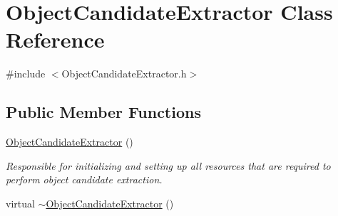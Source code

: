 \hypertarget{class_object_candidate_extractor}{\section{\-Object\-Candidate\-Extractor \-Class \-Reference}
\label{class_object_candidate_extractor}
}


{\ttfamily \#include $<$\-Object\-Candidate\-Extractor.\-h$>$}

\subsection*{\-Public \-Member \-Functions}
\begin{DoxyCompactItemize}
\item 
\hypertarget{class_object_candidate_extractor_a41916df0d27e926a337fff6e7e762010}{\hyperlink{class_object_candidate_extractor_a41916df0d27e926a337fff6e7e762010}{\-Object\-Candidate\-Extractor} ()}\label{class_object_candidate_extractor_a41916df0d27e926a337fff6e7e762010}

\begin{DoxyCompactList}\small\item\em \-Responsible for initializing and setting up all resources that are required to perform object candidate extraction. \end{DoxyCompactList}\item 
\hypertarget{class_object_candidate_extractor_ad1aa824172a7d2e6002d5d7e3104d5d3}{virtual \hyperlink{class_object_candidate_extractor_ad1aa824172a7d2e6002d5d7e3104d5d3}{$\sim$\-Object\-Candidate\-Extractor} ()}\label{class_object_candidate_extractor_ad1aa824172a7d2e6002d5d7e3104d5d3}


\end{DoxyCompactItemize}
